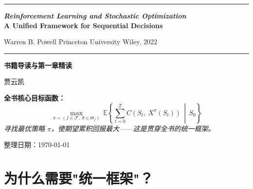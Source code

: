 \documentclass[11pt, a4paper]{article}
\begin{document}
\begin{titlepage}
\centering
\vspace*{1.5cm}
{\color{myblue}\rule{\textwidth}{2pt}}
\vspace{0.8cm}

{\LARGE\bfseries\color{myblue}
\textit{Reinforcement Learning and Stochastic Optimization}\\[0.4em]
A Unified Framework for Sequential Decisions}

\vspace{0.4cm}
{\large Warren B. Powell \quad Princeton University \quad Wiley, 2022}

\vspace{0.6cm}
{\color{myblue}\rule{\textwidth}{2pt}}

\vspace{1.2cm}
{\huge\bfseries 书籍导读与第一章精读}

\vspace{0.5cm}
{\large 贾云凯}

\vspace{2cm}
\begin{tcolorbox}[formulabox, width=0.85\textwidth]
\centering
\textbf{全书核心目标函数：}
\[
  \max_{\pi = (f \in \mathcal{F},\; \theta \in \Theta_f)}\ 
  \mathbb{E}\!\left\{\sum_{t=0}^{T} C(S_t,\ X^\pi(S_t)) \,\middle|\, S_0\right\}
\]
\textit{寻找最优策略 $\pi$，使期望累积回报最大——这是贯穿全书的统一框架。}
\end{tcolorbox}

\vfill
{\normalsize 整理日期：\today}
\end{titlepage}

\begin{abstract}
本文对 Powell（2022）进行系统性介绍。全书核心论断是：强化学习、随机规划、马尔可夫决策过程、最优控制、多臂赌博机等15个研究社区，本质上研究的是同一类问题——\textbf{顺序决策问题}。作者提出"先建模，后求解（Model first, then solve）"的方法论，以\textbf{五元组通用建模框架}统一刻画所有问题，并将所有策略方法归纳为\textbf{四大类型}：策略函数近似（PFA）、代价函数近似（CFA）、价值函数近似（VFA）与直接前瞻近似（DLA）。本文展开第一章核心内容，辅以具体公式和应用场景，供读者快速把握全书方法论框架。
\end{abstract}

\tableofcontents
\newpage

\section{为什么需要"统一框架"？}
\end{document}
